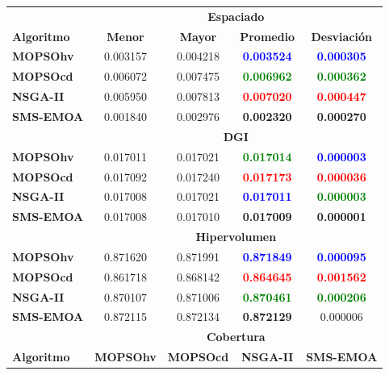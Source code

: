  \begin{table}
 \begin{center}
  \begin{tabular}{|l||cc|cc|} \hline
    & \multicolumn{4}{|c|}{\textbf{Espaciado}} \\     
	\textbf{Algoritmo} & \textbf{Menor} & \textbf{Mayor} & \textbf{Promedio} & \textbf{Desviaci\'on} \\  \hline \hline
	\textbf{MOPSOhv} &0.003157 & 0.004218 & \textbf{\textcolor{blue}{0.003524}} & \textbf{\textcolor{blue}{0.000305}}  \\ 
	\textbf{MOPSOcd} &0.006072 & 0.007475 & \textbf{\textcolor{green}{0.006962}} & \textbf{\textcolor{green}{0.000362}}  \\ 
	\textbf{NSGA-II} &0.005950 & 0.007813 & \textbf{\textcolor{red}{0.007020}} & \textbf{\textcolor{red}{0.000447}}   \\  
	\textbf{SMS-EMOA}&0.001840 & 0.002976 & \textbf{0.002320} & \textbf{0.000270}  \\  
	\hline\hline
    & \multicolumn{4}{|c|}{\textbf{DGI}} \\  \hline \hline
	\textbf{MOPSOhv} &0.017011 & 0.017021 & \textbf{\textcolor{green}{0.017014}} & \textbf{\textcolor{blue}{0.000003}}  \\ 
	\textbf{MOPSOcd} &0.017092 & 0.017240 & \textbf{\textcolor{red}{0.017173}} & \textbf{\textcolor{red}{0.000036}} \\ 
	\textbf{NSGA-II} &0.017008 & 0.017021 & \textbf{\textcolor{blue}{0.017011}} & \textbf{\textcolor{green}{0.000003}} \\  
	\textbf{SMS-EMOA}&0.017008 & 0.017010 & \textbf{0.017009} & \textbf{0.000001}   \\  
	\hline\hline
    & \multicolumn{4}{|c|}{\textbf{Hipervolumen}} \\ \hline\hline 
	\textbf{MOPSOhv} &0.871620 & 0.871991 & \textbf{\textcolor{blue}{0.871849}} & \textbf{\textcolor{blue}{0.000095}}  \\ 
	\textbf{MOPSOcd} &0.861718 & 0.868142 & \textbf{\textcolor{red}{0.864645}} & \textbf{\textcolor{red}{0.001562}} \\ 
	\textbf{NSGA-II} &0.870107 & 0.871006 & \textbf{\textcolor{green}{0.870461}} & \textbf{\textcolor{green}{0.000206}} \\  
	\textbf{SMS-EMOA}&0.872115 & 0.872134 & \textbf{0.872129} & 0.000006 \\  
	\hline\hline
   & \multicolumn{4}{|c|}{\textbf{Cobertura}} \\ \hline\hline 
	\textbf{Algoritmo} & \textbf{MOPSOhv} & \textbf{MOPSOcd} & \textbf{NSGA-II} & \textbf{SMS-EMOA} \\  \hline \hline

\end{tabular}
\end{center}
\end{table}
